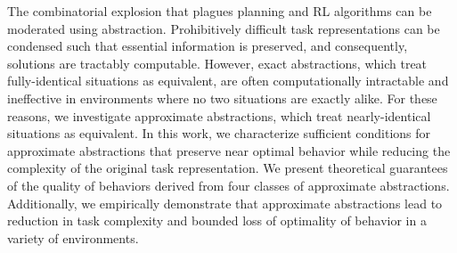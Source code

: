 The combinatorial explosion that plagues planning and \ac{RL} algorithms can be moderated using abstraction. Prohibitively difficult task representations can be condensed such that essential information is preserved, and consequently, solutions are tractably computable. However, exact abstractions, which treat fully-identical situations as equivalent, are often computationally intractable and ineffective in environments where no two situations are exactly alike. For these reasons, we investigate approximate abstractions, which treat nearly-identical situations as equivalent. In this work, we characterize sufficient conditions for approximate abstractions that preserve near optimal behavior while reducing the complexity of the original task representation. We present theoretical guarantees of the quality of behaviors derived from four classes of approximate abstractions. Additionally, we empirically demonstrate that approximate abstractions lead to reduction in task complexity and bounded loss of optimality of behavior in a variety of environments. %










%
%





